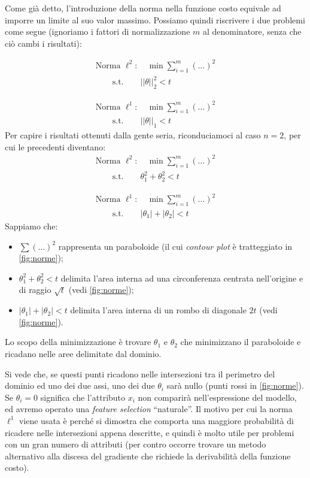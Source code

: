 Come già detto, l'introduzione della norma nella funzione costo equivale ad imporre un limite al suo valor massimo. Possiamo quindi riscrivere i due problemi come segue (ignoriamo i fattori di normalizzazione $m$ al denominatore, senza che ciò cambi i risultati):

\begin{gather}
\text{Norma }\ell^2:
\quad \min\sum_{i=1}^m(\dots)^2 \\
\qquad \text{s.t.} \qquad ||\theta||_2^2 < t
\end{gather}
 
 \begin{gather}
\text{Norma }\ell^1:
\quad \min\sum_{i=1}^m(\dots)^2 \\
\qquad \text{s.t.} \qquad ||\theta||_1 < t
\end{gather}
Per capire i risultati ottenuti dalla gente seria, riconduciamoci al caso $n=2$, per cui le precedenti diventano:
\begin{gather}
\text{Norma }\ell^2:
\quad \min\sum_{i=1}^m(\dots)^2 \\
\qquad \text{s.t.} \qquad \theta_1^2 + \theta_2^2 < t
\end{gather}
 
 \begin{gather}
\text{Norma }\ell^1:
\quad \min\sum_{i=1}^m(\dots)^2 \\
\qquad \text{s.t.} \qquad |\theta_1|+|\theta_2| < t
\end{gather}
Sappiamo che:
\begin{itemize}
\item $\sum(\dots)^2$ rappresenta un paraboloide (il cui \emph{contour plot} è tratteggiato in \autoref{fig:norme});
\item $\theta_1^2 + \theta_2^2 < t$ delimita l'area interna ad una circonferenza centrata nell'origine e di raggio $\sqrt{t}$ (vedi \autoref{fig:norme});
\item $|\theta_1|+|\theta_2| < t$ delimita l'area interna di un rombo di diagonale $2t$ (vedi \autoref{fig:norme}).
\end{itemize}
Lo scopo della minimizzazione è trovare $\theta_1$ e $\theta_2$ che minimizzano il paraboloide e ricadano nelle aree delimitate dal dominio. 



Si vede che, se questi punti ricadono nelle intersezioni tra il perimetro del dominio ed uno dei due assi, uno dei due $\theta_i$ sarà nullo (punti rossi in \autoref{fig:norme}). Se $\theta_i=0$ significa che l'attributo $x_i$ non comparirà nell'espressione del modello, ed avremo operato una \emph{feature selection} ``naturale''. Il motivo per cui la norma $\ell^1$ viene usata è perché si dimostra che comporta una maggiore probabilità di ricadere nelle intersezioni appena descritte, e quindi è molto utile per problemi con un gran numero di attributi (per contro occorre trovare un metodo alternativo alla discesa del gradiente che richiede la derivabilità della funzione costo).


